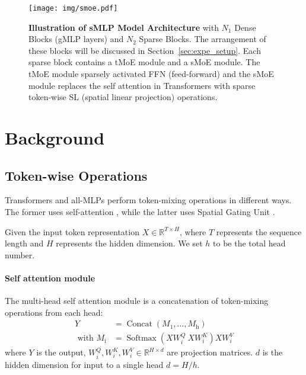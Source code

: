 \documentclass{article}
\begin{document}
\begin{figure*}
    \centering
    \texttt{[image: img/smoe.pdf]}
\caption{\textbf{Illustration of sMLP Model Architecture} with $N_1$ Dense Blocks (gMLP layers) and $N_2$ Sparse Blocks. The arrangement of these blocks will be discussed in Section~\ref{sec:expe_setup}.
    Each sparse block contains a tMoE module and a sMoE module. The tMoE module sparsely activated FFN (feed-forward) and the sMoE module replaces the self attention in Transformers with sparse token-wise SL (spatial linear projection) operations.}
\label{fig:model_frames}
\end{figure*}
 \section{Background}
\label{sec:background}


\subsection{Token-wise Operations}





Transformers and all-MLPs perform token-mixing operations in different ways. The former uses self-attention \citep{vaswani2017attention}, while the latter uses Spatial Gating Unit \citep{gmlp}.

Given the input token representation $X \in \mathbb{R}^{T\times H}$, where $T$ represents the sequence length and $H$ represents the hidden dimension. We set $h$ to be the total head number. 





\vspace{-2mm}
\paragraph{Self attention module}
The multi-head self attention module is a concatenation of token-mixing operations from each head:
\begin{equation}
\begin{aligned}
Y &= \operatorname{Concat}\left(M_{1}, \ldots, M_{\mathrm{h}}\right) \\
\text { with }M_{\mathrm{i}} &= \operatorname{Softmax}(XW_i^Q\ XW_i^K) XW_i^V
\end{aligned}
\label{eq:self_attention}
\end{equation}
where $Y$ is the output, $W_i^Q, W_i^K, W_i^V \in \mathbb{R}^{H \times d}$ are projection matrices. $d$ is the hidden dimension for input to a single head $d = H/h$.
\end{document}
